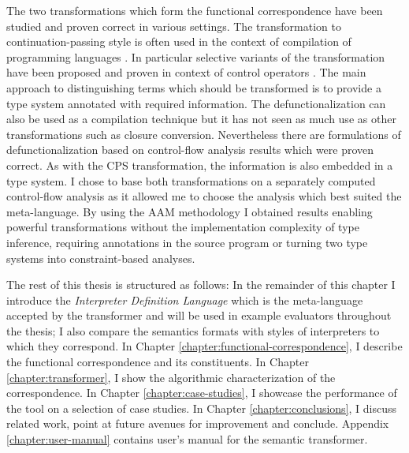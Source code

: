 The two transformations which form the functional correspondence have been studied and proven correct in various settings.
The transformation to continuation-passing style is often used in the context of compilation of programming languages \cite{appel-compiling-with-continuations}.
In particular selective variants of the transformation have been proposed and proven in context of control operators \cite{nielsen-cps}.
The main approach to distinguishing terms which should be transformed is to provide a type system annotated with required information.
The defunctionalization can also be used as a compilation technique but it has not seen as much use as other transformations such as closure conversion.
Nevertheless there are formulations of defunctionalization based on control-flow analysis results \cite{design-and-correctness-cfa} which were proven correct.
As with the CPS transformation, the information is also embedded in a type system.
I chose to base both transformations on a separately computed control-flow analysis as it allowed me to choose the analysis which best suited the meta-language.
By using the AAM methodology I obtained results enabling powerful transformations without the implementation complexity of type inference, requiring annotations in the source program or turning two type systems into constraint-based analyses.



The rest of this thesis is structured as follows:
In the remainder of this chapter I introduce the \textit{Interpreter Definition Language} which is the meta-language accepted by the transformer and will be used in example evaluators throughout the thesis; I also compare the semantics formats with styles of interpreters to which they correspond.
In Chapter \ref{chapter:functional-correspondence}, I describe the functional correspondence and its constituents.
In Chapter \ref{chapter:transformer}, I show the algorithmic characterization of the correspondence.
In Chapter \ref{chapter:case-studies}, I showcase the performance of the tool on a selection of case studies.
In Chapter \ref{chapter:conclusions}, I discuss related work, point at future avenues for improvement and conclude. %
Appendix \ref{chapter:user-manual} contains user's manual for the semantic transformer.

